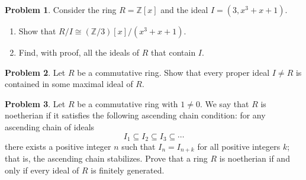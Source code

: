 \documentclass[11pt]{article}
\newcommand{\Z}{\mathbb{Z}}
\theoremstyle{definition}
\newtheorem{problem}{Problem}
\begin{document}
\begin{problem}
Consider the ring $R = \Z[x]$ and the ideal $I = (3, x^3 + x + 1)$.


\begin{enumerate}[label=(3.\arabic*),itemsep=-0.1em]
\vspace{-0.5em}
	\item Show that $R/I \cong (\Z/3)[x]/(x^3 + x + 1)$.
		
	\item Find, with proof, all the ideals of $R$ that contain $I$.
\end{enumerate}
\end{problem}


\begin{problem}
	Let $R$ be a commutative ring. Show that every proper ideal $I \neq R$ is contained in some maximal ideal of $R$.
\end{problem}



\begin{problem}
Let $R$ be a commutative ring with $1 \neq 0$. We say that $R$ is noetherian if it satisfies the following ascending chain condition: for any ascending chain of ideals 
$$I_1 \subseteq I_2 \subseteq I_3 \subseteq \cdots$$ 
there exists a positive integer $n$ such that $I_n=I_{n+k}$ for all positive integers $k$; that is, the ascending chain stabilizes. 
Prove that a ring $R$ is noetherian if and only if every ideal of $R$ is finitely generated.
\end{problem}
\end{document}
